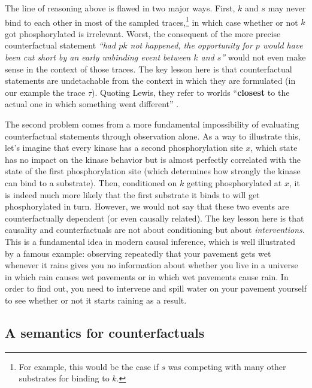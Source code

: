 The line of reasoning above is flawed in two major ways. First, $k$
and $s$ may never bind to each other in most of the sampled
traces,\footnote{For example, this would be the case if $s$ was
  competing with many other substrates for binding to $k$.} in which
case whether or not $k$ got phosphorylated is
irrelevant. Worst, the consequent of the more precise counterfactual
statement \textit{``had $pk$ not happened, the opportunity for $p$
  would have been cut short by an early unbinding event between $k$
  and $s$''} would not even make sense in the context of those traces.
The key lesson here is that counterfactual statements are undetachable
from the context in which they are formulated (in our example the
trace $\tau$). Quoting Lewis, they refer to worlds ``\textbf{closest} to
the actual one in which something went different''
\cite{lewis1974causation}.

The second problem comes from a more fundamental impossibility of
evaluating counterfactual statements through observation alone. As a
way to illustrate this, let's imagine that every kinase has a second
phosphorylation site $x$, which state has no impact on the kinase
behavior but is almost perfectly correlated with the state of the
first phosphorylation site (which determines how strongly the kinase
can bind to a substrate). Then, conditioned on $k$ getting
phosphorylated at $x$, it is indeed much more likely that the first
substrate it binds to will get phosphorylated in turn. However, we
would not say that these two events are counterfactually dependent (or
even causally related). The key lesson here is that causality and
counterfactuals are not about conditioning but about
\emph{interventions}. This is a fundamental idea in modern causal
inference, which is well illustrated by a famous example: observing
repeatedly that your pavement gets wet whenever it rains gives you no
information about whether you live in a universe in which rain causes
wet pavements or in which wet pavements cause rain. In order to find
out, you need to intervene and spill water on your pavement yourself
to see whether or not it starts raining as a result.






\subsection{A semantics for counterfactuals}



